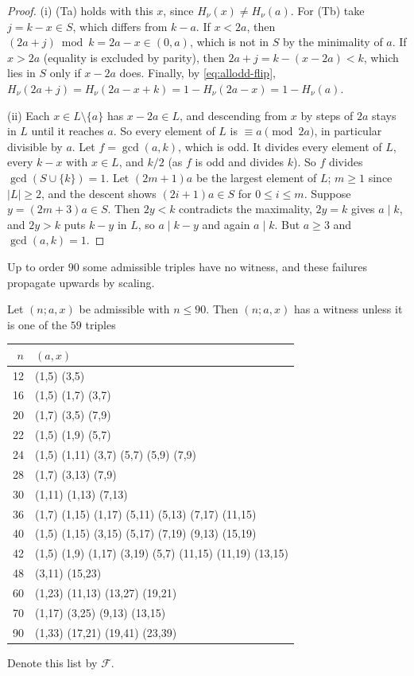 \begin{proof}
(i) (Ta) holds with this $x$, since $H_\nu(x)\ne H_\nu(a)$.
For (Tb) take $j=k-x\in S$, which differs from $k-a$. If $x<2a$, then
$(2a+j)\bmod k=2a-x\in(0,a)$, which is not in $S$ by the minimality of $a$. If
$x>2a$ (equality is excluded by parity), then $2a+j=k-(x-2a)<k$, which lies in
$S$ only if $x-2a$ does. Finally, by \eqref{eq:allodd-flip},
$H_\nu(2a+j)=H_\nu(2a-x+k)=1-H_\nu(2a-x)=
1-H_\nu(a)$.

(ii) Each $x\in L\setminus\{a\}$ has $x-2a\in L$, and descending from $x$
by steps of $2a$ stays in $L$ until it reaches $a$. So every element of $L$
is $\equiv a\pmod{2a}$, in particular divisible by $a$. Let $f=\gcd(a,k)$,
which is odd. It divides every element of $L$, every $k-x$ with $x\in L$, and
$k/2$ (as $f$ is odd and divides $k$). So $f$ divides $\gcd(S\cup\{k\})=1$.
Let $(2m+1)a$ be the largest element of $L$; $m\ge1$ since $|L|\ge2$, and the
descent shows $(2i+1)a\in S$ for $0\le i\le m$. Suppose $y=(2m+3)a\in S$. Then
$2y<k$ contradicts the maximality, $2y=k$ gives $a\mid k$, and $2y>k$ puts
$k-y$ in $L$, so $a\mid k-y$ and again $a\mid k$. But $a\ge3$ and
$\gcd(a,k)=1$.
\end{proof}

Up to order $90$ some admissible triples have no witness, and these failures
propagate upwards by scaling.

\begin{lemma}
\label{lem:allodd-pf}
Let $(n;a,x)$ be admissible with $n\le90$. Then $(n;a,x)$ has a witness
unless it is one of the $59$ triples
\begin{center}
\small
\begin{tabular}{r|l}
$n$ & $(a,x)$\\\hline
12 & (1,5) (3,5)\\
16 & (1,5) (1,7) (3,7)\\
20 & (1,7) (3,5) (7,9)\\
22 & (1,5) (1,9) (5,7)\\
24 & (1,5) (1,11) (3,7) (5,7) (5,9) (7,9)\\
28 & (1,7) (3,13) (7,9)\\
30 & (1,11) (1,13) (7,13)\\
36 & (1,7) (1,15) (1,17) (5,11) (5,13) (7,17) (11,15)\\
40 & (1,5) (1,15) (3,15) (5,17) (7,19) (9,13) (15,19)\\
42 & (1,5) (1,9) (1,17) (3,19) (5,7) (11,15) (11,19) (13,15)\\
48 & (3,11) (15,23)\\
60 & (1,23) (11,13) (13,27) (19,21)\\
70 & (1,17) (3,25) (9,13) (13,15)\\
90 & (1,33) (17,21) (19,41) (23,39)
\end{tabular}
\end{center}
Denote this list by $\mathcal F$.
\end{lemma}

